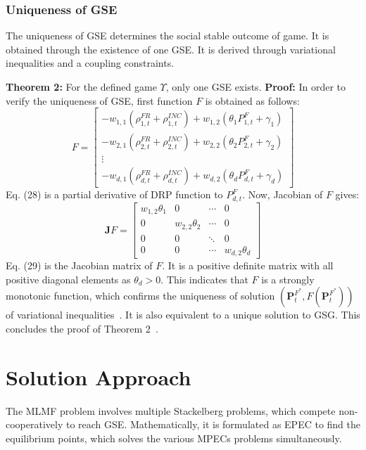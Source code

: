 \documentclass[journal]{IEEEtran}
\begin{document}
\subsubsection{Uniqueness of GSE}
The uniqueness of GSE determines the social stable outcome of game. It is obtained through the existence of one GSE. It is derived through variational inequalities and a coupling constraints. 

\textbf{Theorem 2:} For the defined game $\Upsilon $, only one GSE exists. 
\textbf{Proof:} In order to verify the uniqueness of GSE, first function $F$ is obtained as follows:  
\begin{equation}
F = \left[ {\begin{array}{*{20}{c}}
		{ - w_{1,1}(\rho _{1,t}^{FR} + \rho _{1,t}^{INC}) +  w_{1,2}({\theta _1}P_{1,t}^F + {\gamma _1})}\\
		{ - w_{2,1}(\rho _{2,t}^{FR} + \rho _{2,t}^{INC}) + w_{2,2}({\theta _2}P_{2,t}^F + {\gamma _2})}\\
		\vdots \\
		{ - w_{d,1}(\rho _{d,t}^{FR} + \rho _{d,t}^{INC}) + w_{d,2}({\theta _d}P_{d,t}^F + {\gamma _d})}
\end{array}} \right]
\end{equation}
Eq. (28) is a partial derivative of DRP function to $P_{d,t}^F$. Now, Jacobian of $F$ gives: 
\begin{equation}
\textbf{J}F = \left[ {\begin{array}{*{20}{c}}
		{{w_{1,2}\theta _1}}&0& \cdots &0\\
		0&{{w_{2,2}\theta _2}}& \cdots &0\\
		0&0& \ddots &0\\
		0&0& \cdots &{{w_{d,2}\theta _d}}
\end{array}} \right]
\end{equation}Eq. (29) is the Jacobian matrix of $F$. It is a positive definite matrix with all positive diagonal elements as ${\theta _d} > 0$. This indicates that $F$ is a strongly monotonic function, which confirms the uniqueness of solution $(\boldsymbol{P}_t^{F^{*}},F(\boldsymbol{P}_t^{F^{*}}))$  of variational inequalities~\mbox{\cite{tushar2012economics,facchinei2007generalized,pang2005quasi}}. It is also equivalent to a unique solution to GSG. This concludes the proof of Theorem 2~\cite{facchinei2007generalized}. 

\vspace{-1mm}
\section{Solution Approach}
The MLMF problem involves multiple Stackelberg problems, which compete non-cooperatively to reach GSE. Mathematically, it is formulated as EPEC to find the equilibrium points, which solves the various MPECs problems simultaneously\mbox{\cite{su2004sequential,hobbs2000strategic,cardell1997market}}. 
\end{document}
